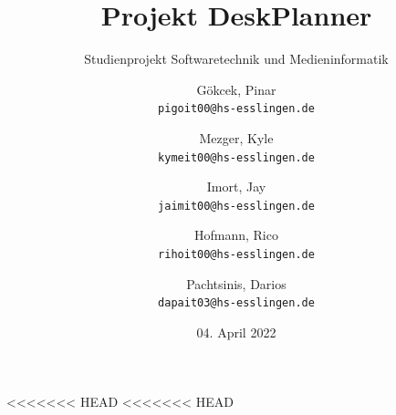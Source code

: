 \documentclass[
    12pt,
    headings=big,
    version=first,
    ngerman,
    a4paper,
    BCOR=5mm,
    DIV=14,
    1headlines,
    pagesize,
    oneside,
    openright,
    titlepage,
    headsepline,
    chapterprefix=false,
    bibliography=totoc,
    toc=graduated,
    listof=graduated,
    numbers=noenddot,
    cleardoublepage=empty,
    fleqn,
    parskip=half,
]{scrbook}
\title{Projekt DeskPlanner}
\subtitle{Studienprojekt Softwaretechnik und Medieninformatik}
\author{
Gökcek, Pinar\\
\texttt{pigoit00@hs-esslingen.de}
\and
Mezger, Kyle\\
\texttt{kymeit00@hs-esslingen.de}
\and
Imort, Jay\\
\texttt{jaimit00@hs-esslingen.de}
\and
Hofmann, Rico\\
\texttt{rihoit00@hs-esslingen.de}
\and
Pachtsinis, Darios\\
\texttt{dapait03@hs-esslingen.de}
}
\date{04. April 2022}
\begin{document}
\begin{titlepage}
    \centering
    \maketitle

    \thispagestyle{empty}

    \vfill

\end{titlepage}

\tableofcontents

\pagebreak

% 




<<<<<<< HEAD
<<<<<<< HEAD
\end{document}
